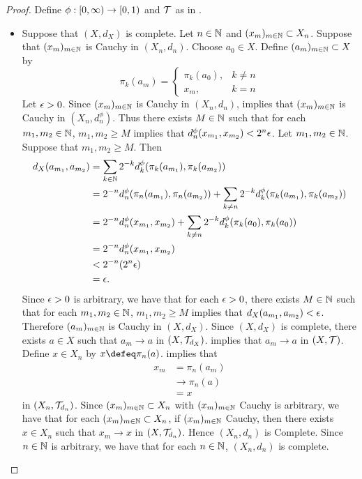 \documentclass{book}
\begin{document}
\begin{proof}
	Define $\phi:[0,\infty) \rightarrow [0, 1)$ and $\mathcal{T}$ as in . 
	\begin{itemize}
		\item Suppose that $(X, d_X)$ is complete. Let $n \in \mathbb{N}$ and $(x_m)_{m \in \mathbb{N}} \subset X_n$. Suppose that $(x_m)_{m \in \mathbb{N}}$ is Cauchy in $(X_n, d_n)$. Choose $a_0 \in X$. Define $(a_m)_{m \in \mathbb{N}} \subset X$ by  
		\[
		\pi_k(a_m) =
		\begin{cases}
			\pi_k(a_0), & k \neq n \\
			x_m, & k = n
		\end{cases}
		\]
		Let $\epsilon > 0$. Since $(x_m)_{m \in \mathbb{N}}$ is Cauchy in $(X_n, d_n)$,  implies that $(x_m)_{m \in \mathbb{N}}$ is Cauchy in $(X_n, d_n^{\phi})$. Thus there exists $M \in \mathbb{N}$ such that for each $m_1, m_2 \in \mathbb{N}$, $m_1, m_2 \geq M$ implies that $d_n^{\phi}(x_{m_1}, x_{m_2}) < 2^n \epsilon$. Let $m_1, m_2 \in \mathbb{N}$. Suppose that $m_1, m_2 \geq M$. Then 
		\begin{align*}
			d_X(a_{m_1}, a_{m_2})
			& = \sum_{k \in \mathbb{N}} 2^{-k} d_k^{\phi}(\pi_k(a_{m_1}), \pi_k(a_{m_2})) \\
			& = 2^{-n} d_n^{\phi}(\pi_n(a_{m_1}), \pi_n(a_{m_2})) + \sum_{k \neq n} 2^{-k} d_k^{\phi}(\pi_k(a_{m_1}), \pi_k(a_{m_2})) \\
			& = 2^{-n} d_n^{\phi}(x_{m_1}, x_{m_2}) + \sum_{k \neq n} 2^{-k} d_k^{\phi}(\pi_k(a_0), \pi_k(a_0)) \\
			& = 2^{-n} d_n^{\phi}(x_{m_1}, x_{m_2}) \\
			& < 2^{-n} (2^n \epsilon) \\
			& = \epsilon .
		\end{align*}
		Since $\epsilon > 0$ is arbitrary, we have that for each $\epsilon > 0$, there exists $M \in \mathbb{N}$ such that for each $m_1, m_2 \in \mathbb{N}$, $m_1, m_2 \geq M$ implies that $d_X(a_{m_1}, a_{m_2}) < \epsilon$. Therefore $(a_m)_{m \in \mathbb{N}}$ is Cauchy in $(X, d_X)$. Since $(X, d_X)$ is complete, there exists $a \in X$ such that $a_m \rightarrow a$ in $(X, \mathcal{T}_{d_X})$.  implies that $a_m \rightarrow a$ in $(X, \mathcal{T})$. Define $x \in X_n$ by $x \defeq \pi_n(a)$.  implies that 
		\begin{align*}
			x_m
			& = \pi_n(a_m) \\
			& \rightarrow \pi_n(a) \\
			& = x
		\end{align*}
		in $(X_n, \mathcal{T}_{d_n})$. Since $(x_m)_{m \in \mathbb{N}} \subset X_n$ with $(x_m)_{m \in \mathbb{N}}$ Cauchy is arbitrary, we have that for each $(x_m)_{m \in \mathbb{N}} \subset X_n$, if $(x_m)_{m \in \mathbb{N}}$ Cauchy, then there exists $x \in X_n$ such that $x_m \rightarrow x$ in $(X, \mathcal{T}_{d_n})$. Hence $(X_n, d_n)$ is Complete. Since $n \in \mathbb{N}$ is arbitrary, we have that for each $n \in \mathbb{N}$, $(X_n, d_n)$ is complete.

\end{itemize}
\end{proof}
\end{document}
